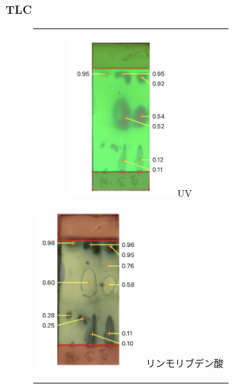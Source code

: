 \documentclass[a4paper,papersize,dvipdfmx]{jsarticle}
\begin{document}
\subsubsection*{TLC}
\begin{figure}[H]
\begin{center}
\begin{tabular}{c}

\begin{minipage}{0.22\hsize}
\begin{center}
\includegraphics[clip, width=4cm]{imgs2/tlc1.jpg}
\hspace{1.6cm} UV
\end{center}
\end{minipage}

\begin{minipage}{0.05\hsize}
        \hspace{2mm}
      \end{minipage}

\begin{minipage}{0.22\hsize}
\begin{center}
\includegraphics[clip, width=4cm]{imgs2/tlc2.jpg}
\hspace{1.6cm} リンモリブデン酸
\end{center}
\end{minipage}

\end{tabular}
\end{center}
\end{figure}
\end{document}
